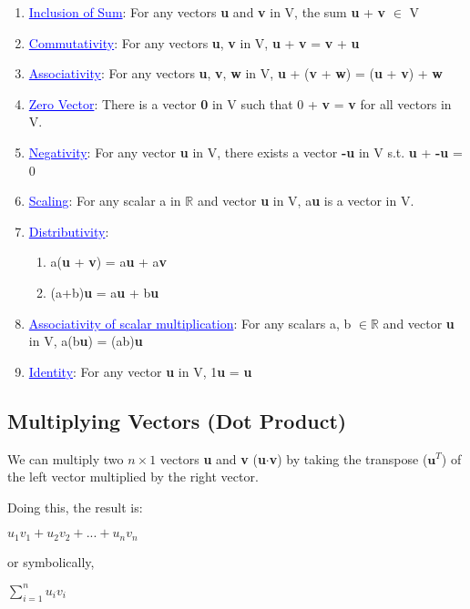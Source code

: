 \documentclass{article}
\newcommand{\bul}[1]{\textcolor{blue}{\underline{#1}}}
\begin{document}
\begin{enumerate}
    \item \bul{Inclusion of Sum}: For any vectors \textbf{u} and \textbf{v} in V, the sum \textbf{u} + \textbf{v} $\in$ V
    \item \bul{Commutativity}: For any vectors \textbf{u}, \textbf{v} in V, \textbf{u} + \textbf{v} = \textbf{v} + \textbf{u}
    \item \bul{Associativity}: For any vectors \textbf{u}, \textbf{v}, \textbf{w} in V, \textbf{u} + (\textbf{v} + \textbf{w}) = (\textbf{u} + \textbf{v}) + \textbf{w}
    \item \bul{Zero Vector}: There is a vector \textbf{0} in V such that 0 + \textbf{v} = \textbf{v} for all vectors in V.
    \item \bul{Negativity}: For any vector \textbf{u} in V, there exists a vector \textbf{-u} in V s.t. \textbf{u} + \textbf{-u} = 0
    \item \bul{Scaling}: For any scalar a in $\mathbb{R}$ and vector \textbf{u} in V, a\textbf{u} is a vector in V.
    \item \bul{Distributivity}: 
    \begin{enumerate}
        \item a(\textbf{u} + \textbf{v}) = a\textbf{u} + a\textbf{v}
        \item (a+b)\textbf{u} = a\textbf{u} + b\textbf{u}
    \end{enumerate}
    \item \bul{Associativity of scalar multiplication}: For any scalars a, b $\in \mathbb{R}$ and vector \textbf{u} in V, a(b\textbf{u}) = (ab)\textbf{u}
    \item \bul{Identity}: For any vector \textbf{u} in V, 1\textbf{u} = \textbf{u}
\end{enumerate}

\subsection{Multiplying Vectors (Dot Product)}
We can multiply two $n\times1$ vectors \textbf{u} and \textbf{v} (\textbf{u}$\cdot$\textbf{v}) by taking the transpose ($\mathbf{u}^T$) of the left vector multiplied by the right vector.

Doing this, the result is:
\begin{center}
    $u_1v_1 + u_2v_2 + ... + u_nv_n$
\end{center}
or symbolically, 
\begin{center}
    $\sum^n_{i=1}u_iv_i$
\end{center}
\end{document}
